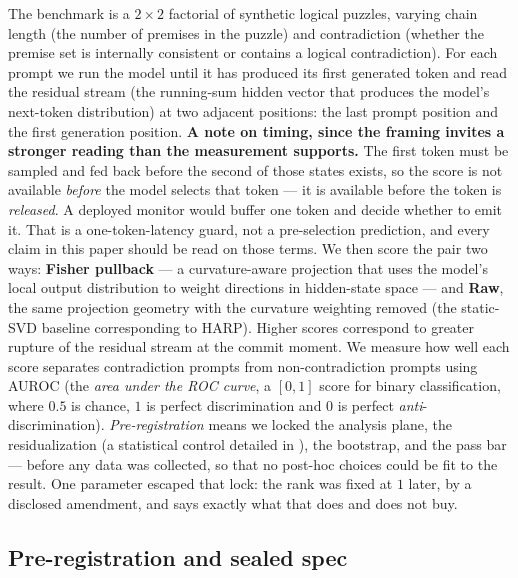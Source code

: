 \documentclass[10pt, letterpaper]{article}
\begin{document}
The benchmark is a $2 \times 2$ factorial of synthetic logical
puzzles, varying chain length (the number of premises in the puzzle)
and contradiction (whether the premise set is internally consistent
or contains a logical contradiction). For each prompt we run the
model until it has produced its first generated token and read the
residual stream (the running-sum hidden vector that produces the
model's next-token distribution) at two adjacent positions: the last
prompt position and the first generation position. \textbf{A note on
timing, since the framing invites a stronger reading than the
measurement supports.} The first token must be sampled and fed back
before the second of those states exists, so the score is not
available \emph{before} the model selects that token --- it is
available before the token is \emph{released}. A deployed monitor
would buffer one token and decide whether to emit it. That is a
one-token-latency guard, not a pre-selection prediction, and every
claim in this paper should be read on those terms. We then score the
pair two ways: \textbf{Fisher pullback} --- a curvature-aware
projection that uses the model's local output distribution to weight
directions in hidden-state space --- and \textbf{Raw}, the same
projection geometry with the curvature weighting removed (the
static-SVD baseline corresponding to HARP). Higher scores correspond
to greater rupture of the residual stream at the commit moment. We
measure how well each score separates contradiction prompts from
non-contradiction prompts using AUROC (the \emph{area under the ROC
curve}, a $[0, 1]$ score for binary classification, where $0.5$ is
chance, $1$ is perfect discrimination and $0$ is perfect
\emph{anti}-discrimination). \emph{Pre-registration}
means we locked the analysis plane, the
residualization (a statistical control detailed in
), the bootstrap, and the pass bar ---
before any data was collected, so that no post-hoc choices could be
fit to the result. One parameter escaped that lock: the rank was fixed
at $1$ later, by a disclosed amendment, and
 says exactly what that does and does not
buy.

\subsection{Pre-registration and sealed spec}
\label{sec:methods:prereg}
\end{document}
